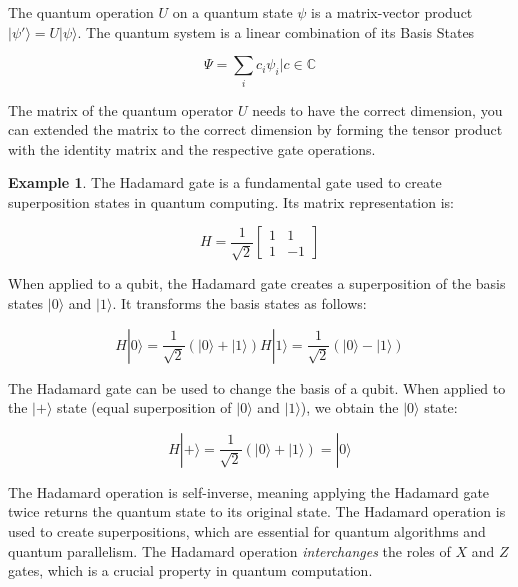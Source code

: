 \documentclass[11pt]{article}
\providecommand{\ket}[1]{|#1\rangle}
\theoremstyle{definition}
\newtheorem{exmp}{Example}[section]
\theoremstyle{definition}
\begin{document}
The quantum operation \(U\) on a quantum state \(\psi\) is a matrix-vector
product \(\ket{\psi'} = U \ket{\psi}\).
The quantum system is a linear combination of its Basis States

\begin{equation}
  \Psi = \sum_{i}c_i \psi_i | c \in \mathbb{C}
\end{equation}

The matrix of the quantum operator \(U\) needs to have the correct
dimension, you can extended the matrix to the correct dimension
by forming the tensor product with the identity matrix and the
respective gate operations.


\begin{exmp}
The Hadamard gate is a fundamental gate used to create superposition states in
quantum computing. Its matrix representation is:

    \begin{equation}
H = \frac{1}{\sqrt{2}} \begin{bmatrix} 1 & 1 \\ 1 & -1 \end{bmatrix}
    \end{equation}

When applied to a qubit, the Hadamard gate creates a superposition of the basis
states $\ket{0}$ and $\ket{1}$. It transforms the basis states as follows:

    \begin{equation}
H\ket{0} = \frac{1}{\sqrt{2}}(\ket{0} + \ket{1})
H\ket{1} = \frac{1}{\sqrt{2}}(\ket{0} - \ket{1})
    \end{equation}


The Hadamard gate can be used to change the basis of a qubit. 
When applied to the $\ket{+}$ state (equal superposition of $\ket{0}$ and
$\ket{1}$), we obtain the $\ket{0}$ state:

    \begin{equation}
H\ket{+} = \frac{1}{\sqrt{2}}(\ket{0} + \ket{1}) = \ket{0}
    \end{equation}

The Hadamard operation is self-inverse, meaning applying the Hadamard gate twice returns the quantum state to its original state.
The Hadamard operation is used to create superpositions, which are essential for quantum algorithms and quantum parallelism.
The Hadamard operation \textit{interchanges} the roles of $X$ and $Z$ gates, which is a crucial property in quantum computation.


\end{exmp}
\end{document}
